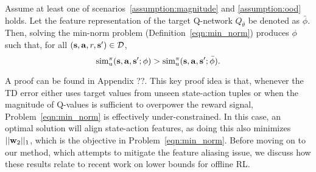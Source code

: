 \begin{theorem}
\label{thm:bootstrapping}
Assume at least one of scenarios~\ref{assumption:magnitude} and \ref{assumption:ood} holds. Let the feature representation of the target Q-network $Q_{\bar{\theta}}$ be denoted as $\bar{\phi}$. Then, solving the min-norm problem (Definition~\ref{eqn:min_norm}) produces $\phi$ such that, for all $(\mathbf{s}, \mathbf{a}, r, \mathbf{s}') \in \mathcal{D}$, 
\begin{equation*}
     \mathrm{sim}_{\mathrm{u}}^\pi(\mathbf{s}, \mathbf{a}, \mathbf{s}'; \phi) > \mathrm{sim}_{\mathrm{u}}^\pi(\mathbf{s}, \mathbf{a}, \mathbf{s}'; \bar{\phi}).
\end{equation*}
\end{theorem}
A proof can be found in Appendix ??. This key proof idea is that, whenever the TD error either uses target values from unseen state-action tuples or when the magnitude of Q-values is sufficient to overpower the reward signal, Problem~\ref{eqn:min_norm} is effectively under-constrained. In this case, an optimal solution will align state-action features, as doing this also minimizes $||\mathbf{w}_2||_1$, which is the objective in Problem~\ref{eqn:min_norm}. Before moving on to our method, which attempts to mitigate the feature aliasing issue, we discuss how these results relate to recent work on lower bounds for offline RL.

\fi